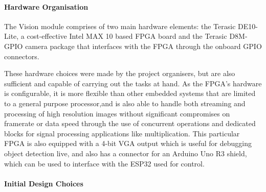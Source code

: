 \documentclass[a4paper]{article}
\begin{document}
\paragraph*{Hardware Organisation}

The Vision module comprises of two main hardware elements: 
    the Terasic DE10-Lite, a cost-effective Intel MAX 10 based FPGA board 
    \cite{TerasicDE10Web} 
    and the Terasic D8M-GPIO camera package \cite{TerasicD8MWeb}
that interfaces with the FPGA through the onboard GPIO connectors. 

These hardware choices were made by the project organisers, 
but are also sufficient and capable of carrying out the tasks at hand. 
As the FPGA's hardware is configurable, 
it is more flexible than other embedded systems 
that are limited to a general purpose processor,and 
is also able to handle both streaming and processing of high resolution images
without significant compromises on framerate or data speed 
through the use of concurrent operations and dedicated blocks 
for signal processing applications like multiplication.
This particular FPGA is also equipped with a 4-bit VGA output 
which is useful for debugging object detection live, 
and also has a connector for an Arduino Uno R3 shield, \cite{TerasicDE10Web} 
which can be used to interface with the ESP32 used for control.  

\paragraph*{Initial Design Choices}
\end{document}
